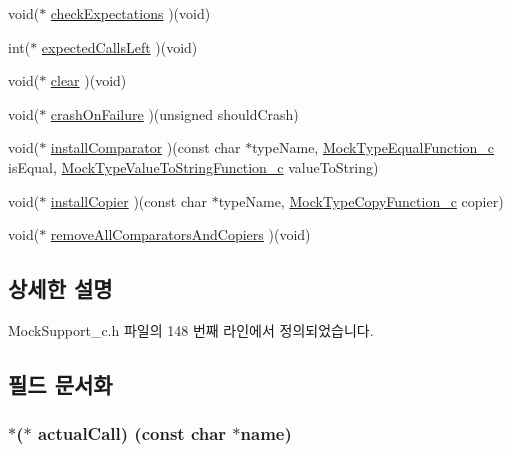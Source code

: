 \begin{DoxyCompactItemize}
\item 
void($\ast$ \hyperlink{struct_s_mock_support__c_adb505c8f6e84105c5620d0913e648eb5}{check\+Expectations} )(void)
\item 
int($\ast$ \hyperlink{struct_s_mock_support__c_a9c8c00b9ab9d35951a17ebb5b8976bc5}{expected\+Calls\+Left} )(void)
\item 
void($\ast$ \hyperlink{struct_s_mock_support__c_a4bc6cb947c21b1928175ae1177e38dc7}{clear} )(void)
\item 
void($\ast$ \hyperlink{struct_s_mock_support__c_a790f0afd45339ca921b86ae52f36429f}{crash\+On\+Failure} )(unsigned should\+Crash)
\item 
void($\ast$ \hyperlink{struct_s_mock_support__c_a6febf7134cf53d8b30ee0ad7bab39b8e}{install\+Comparator} )(const char $\ast$type\+Name, \hyperlink{_mock_support__c_8h_aa5b0cfdc4f4768baad91eb470305c0ff}{Mock\+Type\+Equal\+Function\+\_\+c} is\+Equal, \hyperlink{_mock_support__c_8h_add0b6832f7adeee2cd41537c2c69b388}{Mock\+Type\+Value\+To\+String\+Function\+\_\+c} value\+To\+String)
\item 
void($\ast$ \hyperlink{struct_s_mock_support__c_a601d8bf3ba7c1b3cc26c22f08da0ae05}{install\+Copier} )(const char $\ast$type\+Name, \hyperlink{_mock_support__c_8h_a8afeb5ff4785933c6defdeefa3453e2d}{Mock\+Type\+Copy\+Function\+\_\+c} copier)
\item 
void($\ast$ \hyperlink{struct_s_mock_support__c_a73f1d1f12de7d72609e8f2b3f5e592f9}{remove\+All\+Comparators\+And\+Copiers} )(void)
\end{DoxyCompactItemize}


\subsection{상세한 설명}


Mock\+Support\+\_\+c.\+h 파일의 148 번째 라인에서 정의되었습니다.



\subsection{필드 문서화}
\subsubsection[{\texorpdfstring{actual\+Call}{actualCall}}]{$\ast$($\ast$ actual\+Call) (const char $\ast$name)}\hypertarget{struct_s_mock_support__c_a00af12fd96ffdd7e2f1d9fda6b5bc78d}{}\label{struct_s_mock_support__c_a00af12fd96ffdd7e2f1d9fda6b5bc78d}


